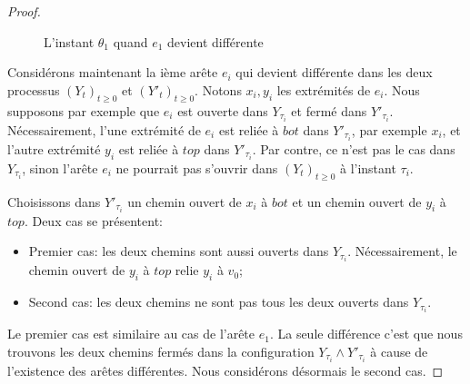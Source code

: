 \documentclass[titlepage,a4paper,12pt]{article}
\newcounter{cor}
\begin{document}
\begin{proof}
\begin{figure}[h]
\begin{minipage}{0.45\linewidth}
\end{minipage}
\begin{minipage}{0.45\linewidth}
\center
{}
\end{minipage}
\caption{L'instant $\theta_1$ quand $e_1$ devient différente}
\label{fig:e1}
\end{figure}

Considérons maintenant la ième arête $e_i$ qui devient différente dans les deux processus $(Y_t)_{t\geqslant 0}$ et $(Y'_t)_{t\geqslant 0}$. Notons $x_i,y_i$ les extrémités de $e_i$. Nous supposons par exemple que $e_i$ est ouverte dans $Y_{\tau_i}$ et fermé dans $Y'_{\tau_i}$. Nécessairement, l'une extrémité de $e_i$ est reliée à $bot$ dans $Y'_{\tau_i}$, par exemple $x_i$, et l'autre extrémité $y_i$ est reliée à $top$ dans $Y'_{\tau_i}$. Par contre, ce n'est pas le cas dans $Y_{\tau_i}$, sinon l'arête $e_i$ ne pourrait pas s'ouvrir dans $(Y_{t})_{t\geqslant 0}$ à l'instant $\tau_i$.

Choisissons dans $Y'_{\tau_i}$ un chemin ouvert de $x_i$ à $bot$ et un chemin ouvert de $y_i$ à $top$.
Deux cas se présentent:
\begin{itemize}[label = $\bullet$, leftmargin =*]
\item Premier cas: les deux chemins sont aussi ouverts dans $Y_{\tau_i}$. Nécessairement, le chemin ouvert de $y_i$ à $top$ relie $y_i$ à $v_0$;
\item Second cas: les deux chemins ne sont pas tous les deux ouverts dans $Y_{\tau_i}$.
\end{itemize}

Le premier cas est similaire au cas de l'arête $e_1$. La seule différence c'est que nous trouvons les deux chemins fermés dans la configuration $Y_{\tau_i}\wedge Y'_{\tau_i}$ à cause de l'existence des arêtes différentes. Nous considérons désormais le second cas.


\end{proof}
\end{document}
